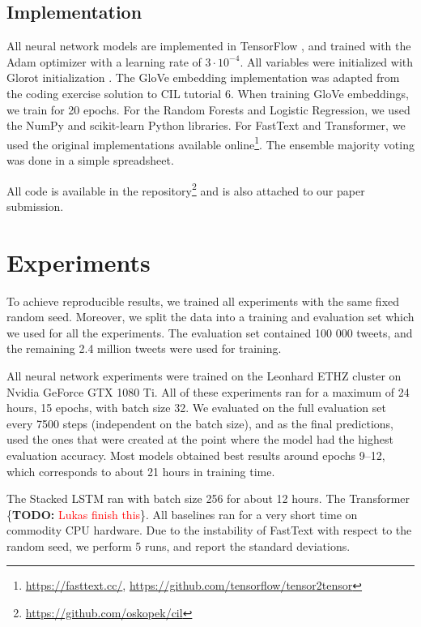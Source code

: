 \documentclass[10pt,conference,compsocconf]{IEEEtran}
\newcommand{\TODO}[1]{\{\textbf{TODO: }\textcolor{red}{#1}\}}
\begin{document}
\subsection{Implementation}
All neural network models are implemented in TensorFlow \cite{tensorflow}, and trained with the Adam optimizer \cite{adam} with a learning rate of $3 \cdot 10^{-4}$. All variables were initialized with Glorot initialization \cite{glorot2010understanding}.
The GloVe embedding implementation was adapted from the coding exercise solution to CIL tutorial 6. When training GloVe embeddings, we train for 20 epochs. For the Random Forests and Logistic Regression, we used the NumPy \cite{numpy} and scikit-learn \cite{scikit-learn} Python libraries.
For FastText and Transformer, we used the original implementations available online\footnote{\url{https://fasttext.cc/}, \url{https://github.com/tensorflow/tensor2tensor}}.
The ensemble majority voting was done in a simple spreadsheet.

All code is available in the repository\footnote{\url{https://github.com/oskopek/cil}} and is also attached to our paper submission.


\section{Experiments}
To achieve reproducible results, we trained all experiments with the same fixed random seed. Moreover, we split the data into a training and evaluation set which we used for all the experiments.
The evaluation set contained 100 000 tweets, and the remaining 2.4 million tweets were used for training.

All neural network experiments were trained on the Leonhard ETHZ cluster on Nvidia GeForce GTX 1080 Ti.
All of these experiments ran for a maximum of 24 hours, 15 epochs,
with batch size 32.
We evaluated on the full evaluation set every 7500 steps (independent on the batch size), and as the final predictions, used the ones that were created at the point where the model had the highest evaluation accuracy.
Most models obtained best results around epochs 9--12, which corresponds
to about 21 hours in training time.

The Stacked LSTM ran with batch size 256 for about 12 hours.
The Transformer \TODO{Lukas finish this}. All baselines
ran for a very short time on commodity CPU hardware.
Due to the instability of FastText with respect to the random seed,
we perform 5 runs, and report the standard deviations. 
  
\end{document}
